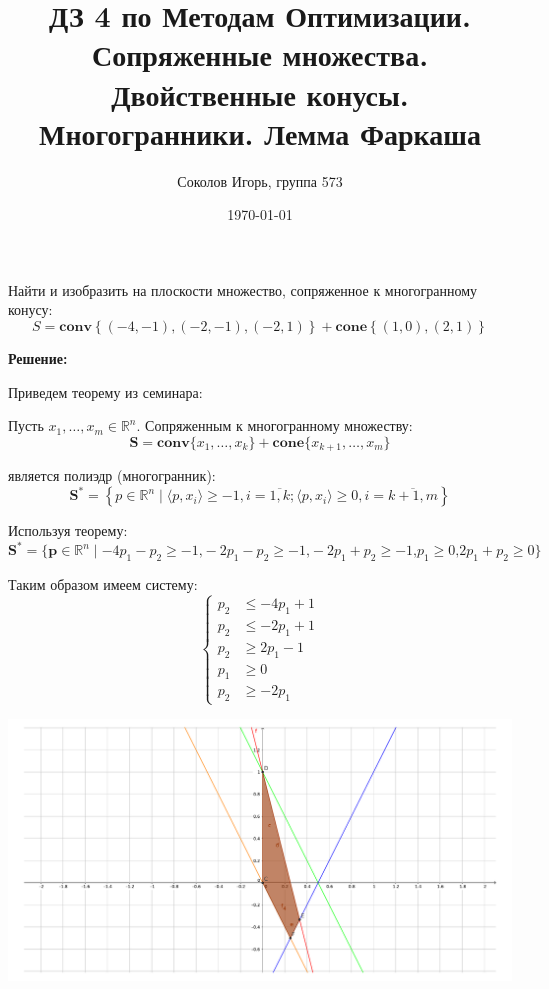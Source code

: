 \documentclass[a4paper,12pt]{article}
\author{Соколов Игорь, группа 573}
\title{ДЗ 4 по Методам Оптимизации. \newline Сопряженные множества. Двойственные конусы. Многогранники. Лемма Фаркаша}
\date{\today}
\begin{document}
	
	\maketitle
	
	\section{}
	
	Найти и изобразить на плоскости множество, сопряженное к многогранному конусу: $$ S = \mathbf{conv} \left\{ (-4,-1), (-2,-1), (-2,1)\right\} + \mathbf{cone} \left\{ (1,0), (2,1)\right\} $$
	
	\vspace{\baselineskip}
	
	\textbf{Решение:}
	
	Приведем теорему из семинара:
	
	Пусть $x_1,\ldots,x_m \in\mathbb{R}^n$. Сопряженным к многогранному множеству:
	$$ \textbf{S} = \mathbf{conv}\{x_1, \ldots, x_k\} + \mathbf{cone}\{x_{k+1}, \ldots, x_m \}$$
	
	является полиэдр (многогранник):
	\[\mathbf{S}^* = \left\{p \in \mathbb{R}^n \mid \langle{ p, x_i }\rangle \ge -1, i = \overline{1, k}; \langle{ p, x_i }\rangle \ge 0 , i =\overline{k+1, m} \right\} \]
	
	Используя теорему:
	\[\mathbf{S}^* = \{\mathbf{p} \in \mathbb{R}^n \mid -4p_1 - p_2 \ge -1\textbf{,} - 2p_1 -p_2 \ge -1\textbf{,} -2p_1 + p_2 \ge -1 \textbf{,} p_1 \ge 0 \textbf{,} 2p_1 + p_2 \ge 0\}\]
	
	Таким образом имеем систему:
	\[
	\left\{
	\begin{aligned}
	p_2 &\leq -4p_1 + 1  \\
	p_2 &\leq -2p_1 + 1\\
	p_2 &\ge 2p_1 - 1\\
	p_1 &\ge 0  \\
	p_2 &\ge -2p_1
	\end{aligned}
	\right.
	\]
	
	\includegraphics[width=\textwidth]{image_problem1.pdf}
	
\end{document}
